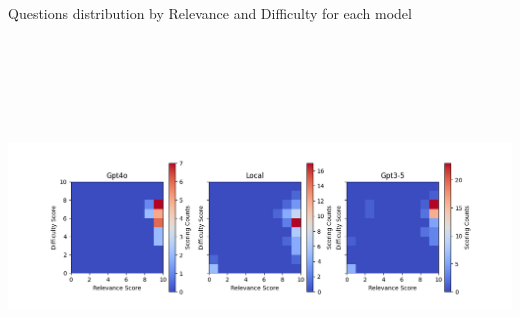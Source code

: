 {
	Questions distribution by Relevance and Difficulty for each model
    \begin{tikzfigure}
        \vspace*{-1cm}
        \hspace*{-3cm}
        \includegraphics[height=10cm]{figures/eval_plot.png}
    \end{tikzfigure}
    \vspace*{-2cm}
}